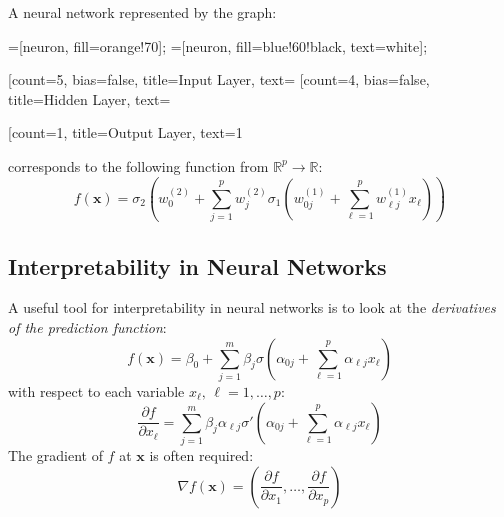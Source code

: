 \begin{example}{}{} A neural network represented by the graph:
	\begin{center}
		\begin{neuralnetwork}[height=5]
			=[neuron, fill=orange!70];
			=[neuron, fill=blue!60!black, text=white];

			\newcommand{\xin}[2]{
				\ifthenelse{\numexpr#2<4\relax}{#2}{
					\ifthenelse{\numexpr#2=4\relax}{\dots}{p}
				}
			}
			\newcommand{\xhid}[2]{
				\ifthenelse{\numexpr#2<3\relax}{#2}{
					\ifthenelse{\numexpr#2=3\relax}{\dots}{m}
				}
			}
			\renewcommand{\xout}[2]{1}

			[count=5, bias=false, title=Input Layer, text=\xin]

			\hiddenlayer[count=4, bias=false, title=Hidden Layer, text=\xhid]
			\linklayers

			\outputlayer[count=1, title=Output Layer, text=\xout]
			\linklayers
		\end{neuralnetwork}
	\end{center}
	corresponds to the following function from $\mathds R^p \to \mathds R$:
	\begin{equation*}
		f(\boldsymbol x) = \sigma_2 \left(
		    w_0^{(2)} + \sum_{j=1}^p w_j^{(2)} \sigma_1 \left(
                w_{0j}^{(1)} + \sum_{\ell=1}^p w_{\ell j}^{(1)} x_\ell
            \right)
		\right)
	\end{equation*}
\end{example}

\subsection{Interpretability in Neural Networks}

A useful tool for interpretability in neural networks is to look at the
\emph{derivatives of the prediction function}:
\begin{equation*}
    f(\boldsymbol x) = 
    \beta_0 + \sum_{j=1}^m \beta_j \sigma \left( \alpha_{0j} + \sum_{\ell=1}^p \alpha_{\ell j} x_\ell \right)
\end{equation*}
with respect to each variable $x_\ell,\,\ell=1,\dots,p$:
\begin{equation*}
    \frac{\partial f}{\partial x_\ell} = \sum_{j=1}^m \beta_j \alpha_{\ell j} \sigma' \left( \alpha_{0j} + \sum_{\ell=1}^p \alpha_{\ell j} x_\ell \right)
\end{equation*}
The gradient of $f$ at $\boldsymbol x$ is often required:
\begin{equation*}
    \nabla f(\boldsymbol x) = \left( \frac{\partial f}{\partial x_1}, \dots, \frac{\partial f}{\partial x_p} \right)
\end{equation*}

